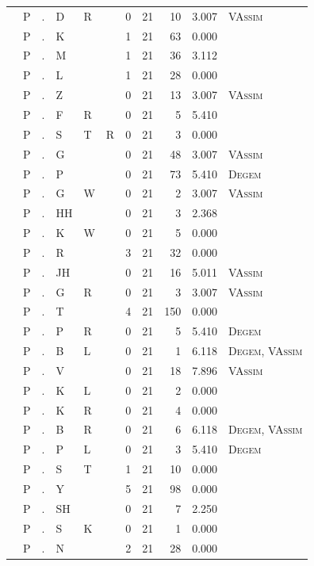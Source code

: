 \documentclass[12pt]{article}
\begin{document}
\begin{longtable}{r@{ } r@{ } c@{ } l@{ } l@{ } l@{ } r r r r l }
 & P & . & D & R &  & 0 & 21 & 10 & 3.007 & \textsc{VAssim} \\
 & P & . & K &  &  & 1 & 21 & 63 & 0.000 &  \\
 & P & . & M &  &  & 1 & 21 & 36 & 3.112 &  \\
 & P & . & L &  &  & 1 & 21 & 28 & 0.000 &  \\
 & P & . & Z &  &  & 0 & 21 & 13 & 3.007 & \textsc{VAssim} \\
 & P & . & F & R &  & 0 & 21 & 5 & 5.410 &  \\
 & P & . & S & T & R & 0 & 21 & 3 & 0.000 &  \\
 & P & . & G &  &  & 0 & 21 & 48 & 3.007 & \textsc{VAssim} \\
 & P & . & P &  &  & 0 & 21 & 73 & 5.410 & \textsc{Degem} \\
 & P & . & G & W &  & 0 & 21 & 2 & 3.007 & \textsc{VAssim} \\
 & P & . & HH &  &  & 0 & 21 & 3 & 2.368 &  \\
 & P & . & K & W &  & 0 & 21 & 5 & 0.000 &  \\
 & P & . & R &  &  & 3 & 21 & 32 & 0.000 &  \\
 & P & . & JH &  &  & 0 & 21 & 16 & 5.011 & \textsc{VAssim} \\
 & P & . & G & R &  & 0 & 21 & 3 & 3.007 & \textsc{VAssim} \\
 & P & . & T &  &  & 4 & 21 & 150 & 0.000 &  \\
 & P & . & P & R &  & 0 & 21 & 5 & 5.410 & \textsc{Degem} \\
 & P & . & B & L &  & 0 & 21 & 1 & 6.118 & \textsc{Degem}, \textsc{VAssim} \\
 & P & . & V &  &  & 0 & 21 & 18 & 7.896 & \textsc{VAssim} \\
 & P & . & K & L &  & 0 & 21 & 2 & 0.000 &  \\
 & P & . & K & R &  & 0 & 21 & 4 & 0.000 &  \\
 & P & . & B & R &  & 0 & 21 & 6 & 6.118 & \textsc{Degem}, \textsc{VAssim} \\
 & P & . & P & L &  & 0 & 21 & 3 & 5.410 & \textsc{Degem} \\
 & P & . & S & T &  & 1 & 21 & 10 & 0.000 &  \\
 & P & . & Y &  &  & 5 & 21 & 98 & 0.000 &  \\
 & P & . & SH &  &  & 0 & 21 & 7 & 2.250 &  \\
 & P & . & S & K &  & 0 & 21 & 1 & 0.000 &  \\
 & P & . & N &  &  & 2 & 21 & 28 & 0.000 &  \\

\end{longtable}
\end{document}
